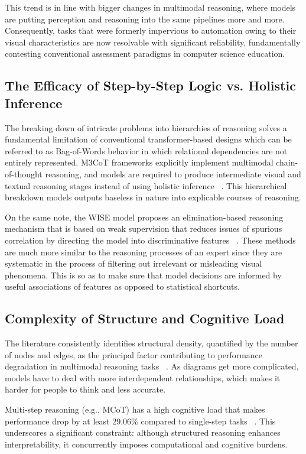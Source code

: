 \documentclass[sigconf, nonacm]{acmart}
\begin{document}
This trend is in line with bigger changes in multimodal reasoning, where 
models are putting perception and reasoning into the same pipelines more 
and more. Consequently, tasks that were formerly impervious to automation 
owing to their visual characteristics are now resolvable with significant 
reliability, fundamentally contesting conventional assessment paradigms in 
computer science education.

\subsection{The Efficacy of Step-by-Step Logic vs. Holistic Inference}
The breaking down of intricate problems into hierarchies of reasoning solves a 
fundamental limitation of conventional transformer-based designs which can be 
referred to as Bag-of-Words behavior in which relational dependencies are not 
entirely represented. M3CoT frameworks explicitly implement multimodal 
chain-of-thought reasoning, and models are required to produce intermediate 
visual and textual reasoning stages instead of using holistic inference~%
\cite{chen2024m3cot}. This hierarchical breakdown models outputs baseless 
in nature into explicable courses of reasoning.

On the same note, the WISE model proposes an elimination-based reasoning 
mechanism that is based on weak supervision that reduces issues of spurious 
correlation by directing the model into discriminative features~%
\cite{jiang2025wise}. These methods are much more similar to the reasoning 
processes of an expert since they are systematic in the process of filtering 
out irrelevant or misleading visual phenomena. This is so as to make sure 
that model decisions are informed by useful associations of features as opposed 
to statistical shortcuts.

\subsection{Complexity of Structure and Cognitive Load}
The literature consistently identifies structural density, quantified by 
the number of nodes and edges, as the principal factor contributing to 
performance degradation in multimodal reasoning tasks~%
\cite{singh2024flowvqa, gutierrez2024seeing}. As diagrams get more 
complicated, models have to deal with more interdependent relationships, 
which makes it harder for people to think and less accurate.

Multi-step reasoning (e.g., MCoT) has a high cognitive load that makes 
performance drop by at least 29.06\% compared to single-step tasks~%
\cite{chen2024m3cot}. This underscores a significant constraint: although 
structured reasoning enhances interpretability, it concurrently imposes 
computational and cognitive burdens.
\end{document}
